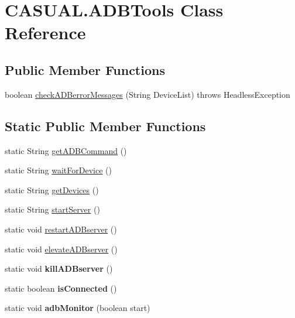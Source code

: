 \hypertarget{classCASUAL_1_1ADBTools}{\section{C\-A\-S\-U\-A\-L.\-A\-D\-B\-Tools Class Reference}
\label{classCASUAL_1_1ADBTools}
}
\subsection*{Public Member Functions}
\begin{DoxyCompactItemize}
\item 
boolean \hyperlink{classCASUAL_1_1ADBTools_a3f80c15c792e2774ddfce012abd15b29}{check\-A\-D\-Berror\-Messages} (String Device\-List)  throws Headless\-Exception 
\end{DoxyCompactItemize}
\subsection*{Static Public Member Functions}
\begin{DoxyCompactItemize}
\item 
static String \hyperlink{classCASUAL_1_1ADBTools_a84c10a21eade2f9a64b124866fc2eec8}{get\-A\-D\-B\-Command} ()
\item 
static String \hyperlink{classCASUAL_1_1ADBTools_ad6c98b109f9abef9677646e4b9ce4eea}{wait\-For\-Device} ()
\item 
static String \hyperlink{classCASUAL_1_1ADBTools_ab84bdc01285090cbe0f3bf8686d4ccf3}{get\-Devices} ()
\item 
static String \hyperlink{classCASUAL_1_1ADBTools_aa88831dea8d8524da74ab7c2dc56bed1}{start\-Server} ()
\item 
static void \hyperlink{classCASUAL_1_1ADBTools_a0336b79dde74ae62f631e50e7de9b8b7}{restart\-A\-D\-Bserver} ()
\item 
static void \hyperlink{classCASUAL_1_1ADBTools_a5156d7e548d08ca6e32ae028b8e38947}{elevate\-A\-D\-Bserver} ()
\item 
\hypertarget{classCASUAL_1_1ADBTools_a61c1a5fc7dabb7bf2ac6d00029efea7f}{static void {\bfseries kill\-A\-D\-Bserver} ()}\label{classCASUAL_1_1ADBTools_a61c1a5fc7dabb7bf2ac6d00029efea7f}

\item 
\hypertarget{classCASUAL_1_1ADBTools_a52dcd818831f3a486f93968f85e3f5ed}{static boolean {\bfseries is\-Connected} ()}\label{classCASUAL_1_1ADBTools_a52dcd818831f3a486f93968f85e3f5ed}

\item 
\hypertarget{classCASUAL_1_1ADBTools_a20d229b6e26aa8a0ae07ed75b49abcc8}{static void {\bfseries adb\-Monitor} (boolean start)}\label{classCASUAL_1_1ADBTools_a20d229b6e26aa8a0ae07ed75b49abcc8}

\end{DoxyCompactItemize}


